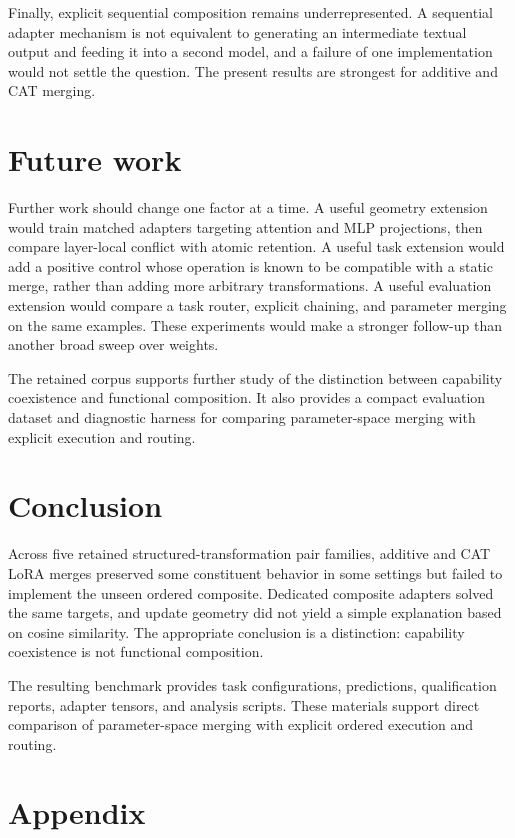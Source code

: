 \documentclass[10pt,twocolumn]{article}
\begin{document}
Finally, explicit sequential composition remains underrepresented. A sequential adapter mechanism is not equivalent to generating an intermediate textual output and feeding it into a second model, and a failure of one implementation would not settle the question. The present results are strongest for additive and CAT merging.

\section{Future work}

Further work should change one factor at a time. A useful geometry extension would train matched adapters targeting attention and MLP projections, then compare layer-local conflict with atomic retention. A useful task extension would add a positive control whose operation is known to be compatible with a static merge, rather than adding more arbitrary transformations. A useful evaluation extension would compare a task router, explicit chaining, and parameter merging on the same examples. These experiments would make a stronger follow-up than another broad sweep over weights.

The retained corpus supports further study of the distinction between capability coexistence and functional composition. It also provides a compact evaluation dataset and diagnostic harness for comparing parameter-space merging with explicit execution and routing.

\section{Conclusion}

Across five retained structured-transformation pair families, additive and CAT LoRA merges preserved some constituent behavior in some settings but failed to implement the unseen ordered composite. Dedicated composite adapters solved the same targets, and update geometry did not yield a simple explanation based on cosine similarity. The appropriate conclusion is a distinction: capability coexistence is not functional composition.

The resulting benchmark provides task configurations, predictions, qualification reports, adapter tensors, and analysis scripts. These materials support direct comparison of parameter-space merging with explicit ordered execution and routing.

\appendix
\section{Appendix}
\end{document}
